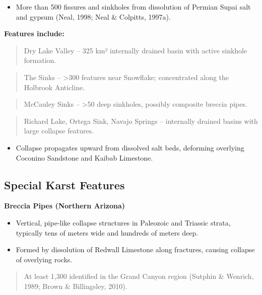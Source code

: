 \documentclass[
]{agujournal2019}
\providecommand{\tightlist}{%
  \setlength{\itemsep}{0pt}\setlength{\parskip}{0pt}}\usepackage{longtable,booktabs,array}
\begin{document}
\begin{itemize}
\tightlist
\item
  More than 500 fissures and sinkholes from dissolution of Permian Supai
  salt and gypsum (Neal, 1998; Neal \& Colpitts, 1997a).
\end{itemize}

\textbf{Features include:}

\begin{quote}
Dry Lake Valley -- 325 km² internally drained basin with active sinkhole
formation.
\end{quote}

\begin{quote}
The Sinks -- \textgreater300 features near Snowflake; concentrated along
the Holbrook Anticline.
\end{quote}

\begin{quote}
McCauley Sinks -- \textgreater50 deep sinkholes, possibly composite
breccia pipes.
\end{quote}

\begin{quote}
Richard Lake, Ortega Sink, Navajo Springs -- internally drained basins
with large collapse features.
\end{quote}

\begin{itemize}
\tightlist
\item
  Collapse propagates upward from dissolved salt beds, deforming
  overlying Coconino Sandstone and Kaibab Limestone.
\end{itemize}

\subsection{Special Karst Features}\label{special-karst-features}

\textbf{Breccia Pipes (Northern Arizona)}

\begin{itemize}
\item
  Vertical, pipe-like collapse structures in Paleozoic and Triassic
  strata, typically tens of meters wide and hundreds of meters deep.
\item
  Formed by dissolution of Redwall Limestone along fractures, causing
  collapse of overlying rocks.
\end{itemize}

\begin{quote}
At least 1,300 identified in the Grand Canyon region (Sutphin \&
Wenrich, 1989; Brown \& Billingsley, 2010).
\end{quote}
\end{document}
